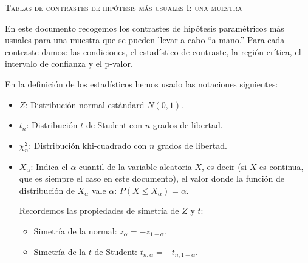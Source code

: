 \documentclass[landscape,spanish,16pt]{article}
\renewcommand{\leq}{\leqslant}
\begin{document}

\renewcommand{\thecas}{\Roman{cas}}
\newcommand{\posacas}{\addtocounter{cas}{1}{\bf \thecas}}

\begin{center}
\textsc{Tablas de contrastes de hipótesis más usuales I: una muestra}
\end{center}
\vspace*{2cm}

\noindent En este documento recogemos los contrastes de hipótesis paramétricos más usuales para una muestra  que se pueden llevar a cabo ``a mano.'' Para cada contraste damos: las condiciones, el estadístico
de contraste, la región crítica, 
el intervalo de confianza y el p-valor.

En la definición de los estadísticos hemos usado las notaciones siguientes:
\begin{itemize}
\item  $Z$: {Distribución normal estándard $N(0,1)$.} 
\item $t_n$: {Distribución
$t$ de Student con $n$ grados de libertad.} 
\item $\chi_n^2$: {Distribución
khi-cuadrado con $n$ grados de libertad.} 
\item $X_\alpha$: Indica el $\alpha$-cuantil de la variable aleatoria $X$, es decir (si $X$ es continua, que es siempre el caso en este documento), el valor donde la función
de distribución de $X_\alpha$ vale $\alpha$: $P(X\leq X_\alpha
)=\alpha$. 

Recordemos las propiedades de simetría de $Z$ y   $t$:
\begin{itemize}
\item Simetría de la normal: $z_\alpha = -z_{1-\alpha}.$
\item Simetría de la $t$ de Student: $t_{n,\alpha} = -t_{n,1-\alpha}.$
\end{itemize}
\end{itemize}

\newpage

\newpage
\end{document}
